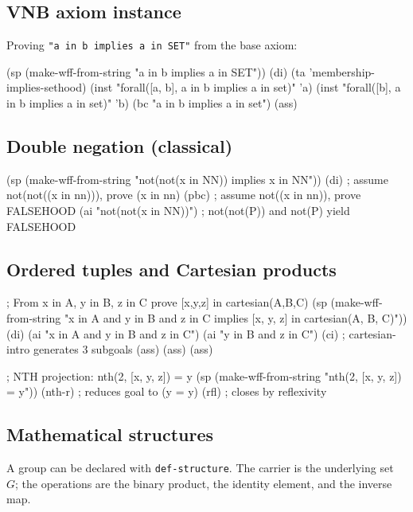 \documentclass{amsbook}[openany]
\theoremstyle{definition}
\theoremstyle{remark}
\theoremstyle{remark}
\begin{document}
\subsection{VNB axiom instance}

Proving \texttt{"a in b implies a in SET"} from the base axiom:

\begin{VNBcode}
(sp (make-wff-from-string "a in b implies a in SET"))
(di)
(ta 'membership-implies-sethood)
(inst "forall([a, b], a in b implies a in set)" 'a)
(inst "forall([b], a in b implies a in set)" 'b)
(bc "a in b implies a in set")
(ass)
\end{VNBcode}

\subsection{Double negation (classical)}

\begin{VNBcode}
(sp (make-wff-from-string "not(not(x in NN)) implies x in NN"))
(di)                              ; assume not(not((x in nn))), prove (x in nn)
(pbc)                             ; assume not((x in nn)), prove FALSEHOOD
(ai "not(not(x in NN))")         ; not(not(P)) and not(P) yield FALSEHOOD
\end{VNBcode}

\subsection{Ordered tuples and Cartesian products}

\begin{VNBcode}
; From x in A, y in B, z in C prove [x,y,z] in cartesian(A,B,C)
(sp (make-wff-from-string
      "x in A and y in B and z in C implies [x, y, z] in cartesian(A, B, C)"))
(di)
(ai "x in A and y in B and z in C")
(ai "y in B and z in C")
(ci)              ; cartesian-intro generates 3 subgoals
(ass) (ass) (ass)

; NTH projection: nth(2, [x, y, z]) = y
(sp (make-wff-from-string "nth(2, [x, y, z]) = y"))
(nth-r)           ; reduces goal to (y = y)
(rfl)             ; closes by reflexivity
\end{VNBcode}

\subsection{Mathematical structures}

A group can be declared with \texttt{def-structure}.  The carrier is the
underlying set~$G$; the operations are the binary product, the identity
element, and the inverse map.
\end{document}
